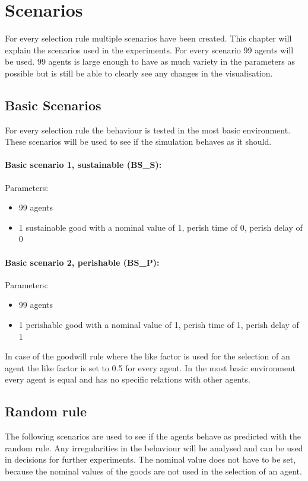 \documentclass[twoside,openright]{uva-bachelor-thesis}
\begin{document}
\chapter{Scenarios}
For every selection rule multiple scenarios have been created. This chapter will explain the scenarios used in the experiments. For every scenario 99 agents will be used. 99 agents is large enough to have as much variety in the parameters as possible but is still be able to clearly see any changes in the visualisation.  

\section{Basic Scenarios}
For every selection rule the behaviour is tested in the most basic environment. These scenarios will be used to see if the simulation behaves as it should.
\subsubsection{Basic scenario 1, sustainable (BS\_S):}
Parameters:
\begin{itemize}
\item	99 agents
\item	1 sustainable good with a nominal value of 1, perish time of 0, perish delay of 0
\end{itemize}
\subsubsection{Basic scenario 2, perishable (BS\_P):}
Parameters:
\begin{itemize}
\item	99 agents
\item	1 perishable good with a nominal value of 1, perish time of 1, perish delay of 1
\end{itemize}
In case of the goodwill rule where the like factor is used for the selection of an agent the like factor is set to 0.5 for every agent. In the most basic environment every agent is equal and has no specific relations with other agents.

\section{Random rule}
The following scenarios are  used to see if the agents behave as predicted with the random rule.  Any irregularities in the behaviour will be analysed and can be used in decisions for further experiments. The nominal value does not have to be set, because the nominal values of the goods are not used in the selection of an agent.
\end{document}
